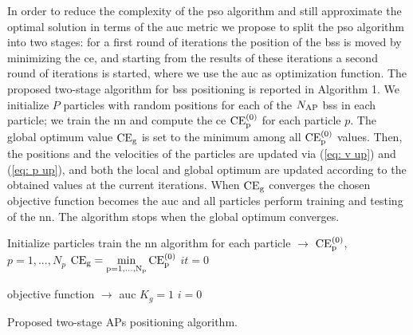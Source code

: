 \documentclass[conference]{IEEEtran}
\begin{document}
In order to reduce the complexity of the \ac{pso} algorithm and still approximate the optimal solution in terms of the \ac{auc} metric we propose to split the \ac{pso} algorithm into two stages: for a first round of iterations the position of the \acp{bs} is moved by minimizing the \ac{ce}, and starting from the results of these iterations a second round  of iterations is started, where we use the \ac{auc} as optimization function. 
The proposed two-stage algorithm for \acp{bs} positioning is reported in Algorithm 1. We initialize $P$ particles with random positions for each of the $N_{\rm AP}$ \acp{bs} in each particle; we train the \ac{nn} and compute the \ac{ce} $\rm{CE}_p^{(0)}$ for each particle $p$. The global optimum value $\rm{CE}_g$ is set to the minimum among all $\rm{CE}_p^{(0)}$ values. Then, the positions and the velocities of the particles are updated via (\ref{eq: v up}) and (\ref{eq: p up}), and both the local and global optimum are updated according to the obtained values at the current iterations. When $\rm{CE}_g$ converges the chosen objective function becomes the \ac{auc} and all particles perform  training and testing of the \ac{nn}. The algorithm stops when the global optimum converges.

 \begin{algorithm}[b!]

\small

  Initialize particles\;
  train the \ac{nn} algorithm for each particle $\to$ $\rm{CE}_p^{(0)}$, $p=1,...,N_p$\;
  $\rm{CE}_g=\underset{p=1,...,N_p}{min} \, \rm{CE}_p^{(0)}$\;
  $it = 0$\;

      
      objective function $\to$ \ac{auc}\;
      $K_g = 1$\;
      $i = 0$\;
    
\caption{Proposed two-stage APs positioning algorithm.}
 \end{algorithm}
\end{document}
